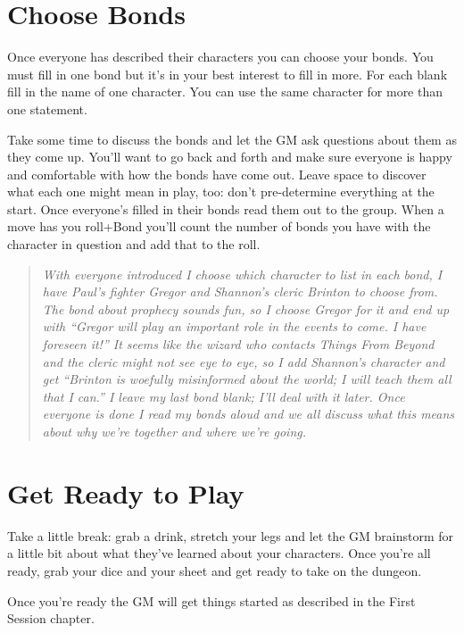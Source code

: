 \section{Choose Bonds}


 Once everyone has described their characters you can choose your bonds. You must fill in one bond but it's in your best interest to fill in more. For each blank fill in the name of one character. You can use the same character for more than one statement.


 Take some time to discuss the bonds and let the GM ask questions about them as they come up. You'll want to go back and forth and make sure everyone is happy and comfortable with how the bonds have come out. Leave space to discover what each one might mean in play, too: don't pre-determine everything at the start. Once everyone's filled in their bonds read them out to the group. When a move has you roll+Bond you'll count the number of bonds you have with the character in question and add that to the roll.


\begin{quote}
\emph{ With everyone introduced I choose which character to list in each bond, I have Paul's fighter Gregor and Shannon's cleric Brinton to choose from. The bond about prophecy sounds fun, so I choose Gregor for it and end up with ``Gregor will play an important role in the events to come. I have foreseen it!'' It seems like the wizard who contacts Things From Beyond and the cleric might not see eye to eye, so I add Shannon's character and get ``Brinton is woefully misinformed about the world; I will teach them all that I can.'' I leave my last bond blank; I'll deal with it later. Once everyone is done I read my bonds aloud and we all discuss what this means about why we're together and where we're going.}
\end{quote}
\section{Get Ready to Play}


 Take a little break: grab a drink, stretch your legs and let the GM brainstorm for a little bit about what they've learned about your characters. Once you're all ready, grab your dice and your sheet and get ready to take on the dungeon.


 Once you're ready the GM will get things started as described in the First Session chapter.


